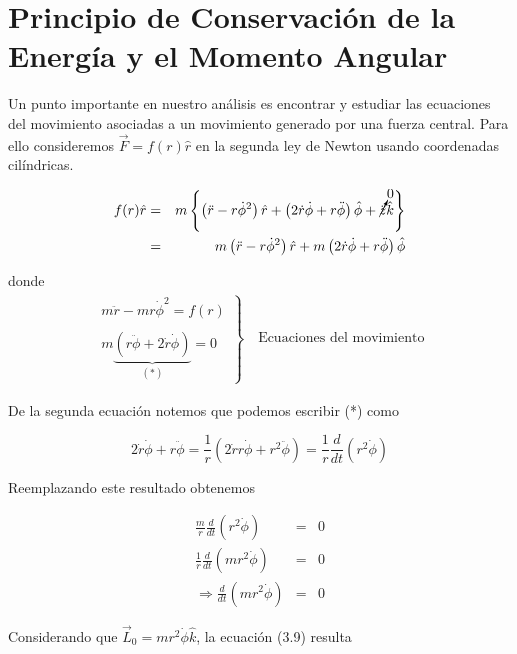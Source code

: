 \documentclass[12pt]{report}
\begin{document}
\section{Principio de Conservación de la Energía y el Momento Angular}

Un punto importante en nuestro análisis es encontrar y estudiar las ecuaciones del movimiento asociadas a un movimiento generado por una fuerza central. Para ello consideremos $\vec{F}=f(r)\hat{r}$ en la segunda ley de Newton usando coordenadas cilíndricas.

\begin{eqnarray}
f(r)\hat{r}&=&m \left\{  \left( \ddot{r}- r \dot{\phi}^2 \right)\hat{r} + \left( 2 \dot{r} \dot{\phi} + r\ddot{\phi}  \right)\hat{\phi} + \cancelto{0}{\ddot{z}} \hat{k}  \right\} \\
&=& m  \left( \ddot{r}- r \dot{\phi}^2 \right)\hat{r} + m\left( 2 \dot{r} \dot{\phi} + r\ddot{\phi}  \right)\hat{\phi} 
\end{eqnarray}

donde
\begin{eqnarray} 
\left. \begin{matrix}
m \ddot{r} -mr \dot{\phi}^2 = f(r)   \\ \\ 
m\underbrace{\left(r\ddot{\phi} + 2\dot{r}\dot{\phi}\right)}_{(*)}=0
\end{matrix}\right\} 
\quad \mbox{Ecuaciones del movimiento}
\end{eqnarray} 

De la segunda ecuación notemos que podemos escribir (*) como

\begin{equation}
2\dot{r}\dot{\phi} + r\ddot{\phi} = \frac{1}{r} \left( 2\dot{r}r \dot{\phi} + r^2 \ddot{\phi} \right) = \frac{1}{r} \frac{d}{dt}\left(r^2 \dot{\phi}\right)
\end{equation}

Reemplazando este resultado obtenemos

\begin{eqnarray}
\frac{m}{r}\frac{d}{dt} \left( r^2 \dot{\phi} \right)&=&0 \\
\frac{1}{r} \frac{d}{dt} \left( mr^2 \dot{\phi} \right)&=&0 \\
\Rightarrow \frac{d}{dt} \left( mr^2 \dot{\phi} \right)&=&0
\end{eqnarray}

Considerando que $\vec{L}_0 = mr^2 \dot{\phi} \hat{k}$, la ecuación (3.9) resulta
\end{document}
